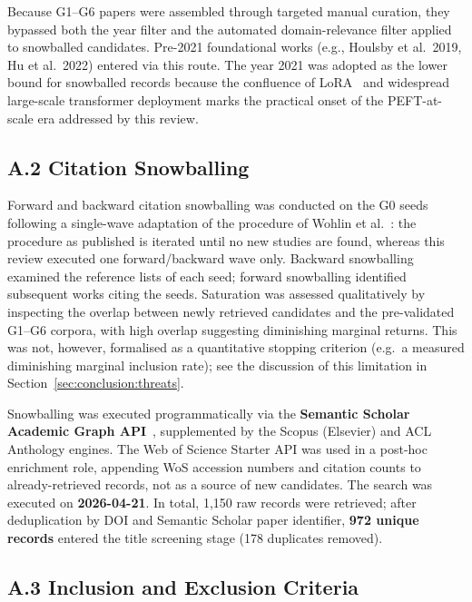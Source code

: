 Because G1--G6 papers were assembled through targeted manual curation, they
bypassed both the year filter and the automated domain-relevance filter
applied to snowballed candidates. Pre-2021 foundational works (e.g.,
Houlsby et al.\ 2019, Hu et al.\ 2022) entered via this route. The year 2021
was adopted as the lower bound for snowballed records because the confluence
of LoRA~\cite{Hu2022} and widespread large-scale transformer deployment marks
the practical onset of the PEFT-at-scale era addressed by this review.

\subsection*{A.2 Citation Snowballing}

Forward and backward citation snowballing was conducted on the G0 seeds
following a single-wave adaptation of the procedure of Wohlin et
al.~\cite{Wohlin2014}: the procedure as published is iterated until no new
studies are found, whereas this review executed one forward/backward wave only.
Backward snowballing examined the reference lists of each seed; forward
snowballing identified subsequent works citing the seeds. Saturation was
assessed qualitatively by inspecting the overlap
between newly retrieved candidates and the pre-validated G1--G6 corpora, with
high overlap suggesting diminishing marginal returns. This was not, however,
formalised as a quantitative stopping criterion (e.g.\ a measured diminishing
marginal inclusion rate); see the discussion of this limitation in
Section~\ref{sec:conclusion:threats}.

Snowballing was executed programmatically via the \textbf{Semantic Scholar
Academic Graph API}~\cite{SemanticScholar2023}, supplemented by the Scopus
(Elsevier) and ACL Anthology engines. The Web of Science Starter API was used
in a post-hoc enrichment role, appending WoS accession numbers and citation
counts to already-retrieved records, not as a source of new candidates. The
search was executed on \textbf{2026-04-21}. In total, 1,150 raw records were
retrieved; after deduplication by DOI and Semantic Scholar paper identifier,
\textbf{972 unique records} entered the title screening stage (178 duplicates
removed).

\subsection*{A.3 Inclusion and Exclusion Criteria}

